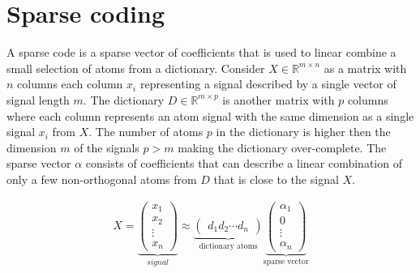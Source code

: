 \chapter{Sparse coding}
\label{chap:sparse_coding}

A sparse code is a sparse vector of coefficients that is used 
to linear combine a small selection of atoms from a dictionary.
Consider $X \in \mathbb{R}^{m\times n}$  as a matrix with $n$ columns each
column $x_{i}$ representing a signal described by a single vector of
signal length $m$. The dictionary $D\in\mathbb{R}^{m \times p}$ is another
matrix with $p$ columns where each column represents an atom signal with the
same dimension as a single signal $x_{i}$ from $X$. The number of 
atoms $p$ in the dictionary is higher then the dimension $m$ of the signals
$p > m$ making the dictionary over-complete. The sparse vector $\alpha$ consists
of coefficients that can describe a linear combination of only a few
non-orthogonal atoms from $D$ that is close to the signal $X$. 

\begin{align}
X = \underbrace{\begin{pmatrix} x_1 \\ x_2 \\ \vdots \\ x_n
\end{pmatrix}}_{signal}
\approx \underbrace{\begin{pmatrix} d_1  d_2 \cdots d_n
\end{pmatrix}}_{\textrm{dictionary atoms}}
\underbrace{\begin{pmatrix} \alpha_1 \\ 0 \\ \vdots \\ \alpha_n
\end{pmatrix}}_{\textrm{sparse vector}}
\end{align}


